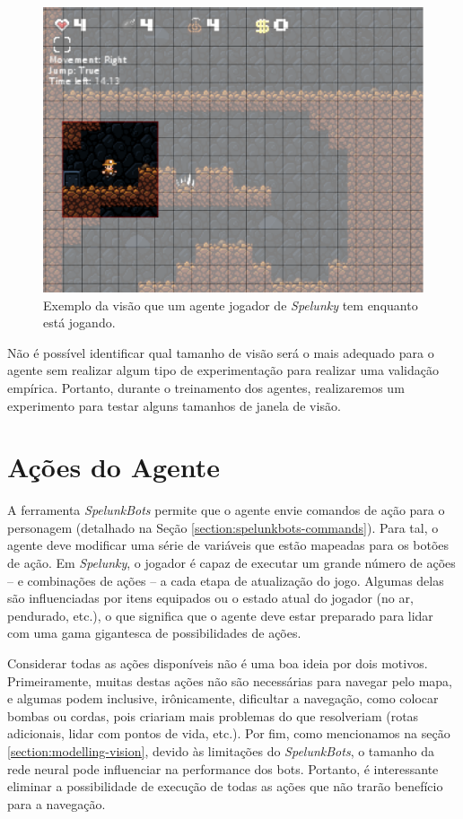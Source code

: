 \begin{figure}[htb!]
\centering
\includegraphics[width=.65\textwidth]{fig/spelunkbots-bot-vision.pdf}
\caption{\label{fig:vision-limitation}Exemplo da visão que um agente jogador de
\textit{Spelunky} tem enquanto está jogando.}
\end{figure}


Não é possível identificar qual tamanho de visão será o mais adequado para o
agente sem realizar algum tipo de experimentação para realizar uma validação
empírica. Portanto, durante o treinamento dos agentes, realizaremos um
experimento para testar alguns tamanhos de janela de visão.


\section{\label{section:modelling-outputs}Ações do Agente}
A ferramenta \textit{SpelunkBots} permite que o agente envie comandos de ação
para o personagem (detalhado na Seção \ref{section:spelunkbots-commands}). Para
tal, o agente deve modificar uma série de variáveis que estão mapeadas para os
botões de ação. Em \textit{Spelunky}, o jogador é capaz de executar um grande
número de ações -- e combinações de ações -- a cada etapa de atualização do
jogo. Algumas delas são influenciadas por itens equipados ou o estado atual do
jogador (no ar, pendurado, etc.), o que significa que o agente deve estar
preparado para lidar com uma gama gigantesca de possibilidades de ações.

Considerar todas as ações disponíveis não é uma boa ideia por dois motivos.
Primeiramente, muitas destas ações não são necessárias para navegar pelo mapa, e
algumas podem inclusive, irônicamente, dificultar a navegação, como colocar
bombas ou cordas, pois criariam mais problemas do que resolveriam (rotas
adicionais, lidar com pontos de vida, etc.). Por fim, como mencionamos na seção
\ref{section:modelling-vision}, devido às limitações do \textit{SpelunkBots}, o
tamanho da rede neural pode influenciar na performance dos bots. Portanto, é
interessante eliminar a possibilidade de execução de todas as ações que não
trarão benefício para a navegação.

